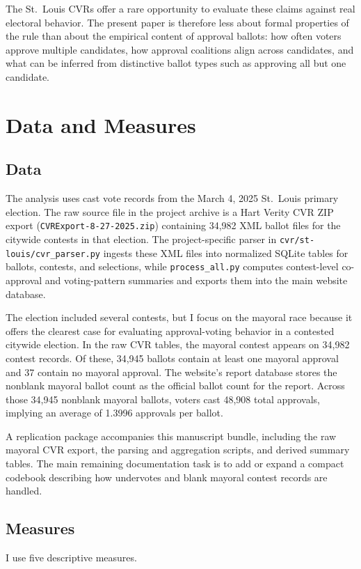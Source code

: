 \documentclass[11pt]{article}
\begin{document}
The St.~Louis CVRs offer a rare opportunity to evaluate these claims against real electoral behavior. The present paper is therefore less about formal properties of the rule than about the empirical content of approval ballots: how often voters approve multiple candidates, how approval coalitions align across candidates, and what can be inferred from distinctive ballot types such as approving all but one candidate.

\section{Data and Measures}
\subsection{Data}
The analysis uses cast vote records from the March 4, 2025 St.~Louis primary election. The raw source file in the project archive is a Hart Verity CVR ZIP export (\texttt{CVRExport-8-27-2025.zip}) containing 34,982 XML ballot files for the citywide contests in that election. The project-specific parser in \texttt{cvr/st-louis/cvr\_parser.py} ingests these XML files into normalized SQLite tables for ballots, contests, and selections, while \texttt{process\_all.py} computes contest-level co-approval and voting-pattern summaries and exports them into the main website database.

The election included several contests, but I focus on the mayoral race because it offers the clearest case for evaluating approval-voting behavior in a contested citywide election. In the raw CVR tables, the mayoral contest appears on 34,982 contest records. Of these, 34,945 ballots contain at least one mayoral approval and 37 contain no mayoral approval. The website's report database stores the nonblank mayoral ballot count as the official ballot count for the report. Across those 34,945 nonblank mayoral ballots, voters cast 48,908 total approvals, implying an average of 1.3996 approvals per ballot.

A replication package accompanies this manuscript bundle, including the raw mayoral CVR export, the parsing and aggregation scripts, and derived summary tables. The main remaining documentation task is to add or expand a compact codebook describing how undervotes and blank mayoral contest records are handled.

\subsection{Measures}
I use five descriptive measures.
\end{document}
